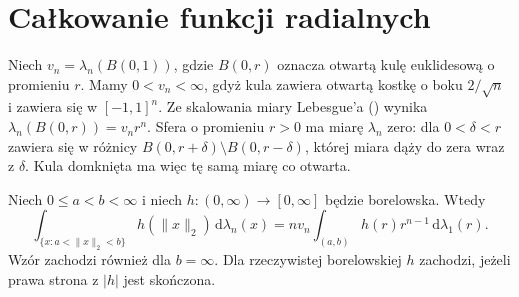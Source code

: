 \section{Całkowanie funkcji radialnych}

Niech $v_n=\lambda_n(B(0,1))$, gdzie $B(0,r)$
oznacza otwartą kulę euklidesową o promieniu $r$.
Mamy $0<v_n<\infty$, gdyż kula zawiera otwartą
kostkę o boku $2/\sqrt n$ i zawiera się w $[-1,1]^n$.
Ze skalowania miary Lebesgue'a
()
wynika $\lambda_n(B(0,r))=v_nr^n$.
Sfera o promieniu $r>0$ ma miarę $\lambda_n$ zero:
dla $0<\delta<r$ zawiera się w różnicy
$B(0,r+\delta)\setminus B(0,r-\delta)$, której
miara dąży do zera wraz z $\delta$.
Kula domknięta ma więc tę samą miarę co otwarta.

\begin{twierdzenie}
\label{ma2:thm:improper-radial}
Niech $0\le a<b<\infty$ i niech
$h:(0,\infty)\to[0,\infty]$ będzie borelowska.
Wtedy
\[
 \int_{\{x:a<\|x\|_2<b\}}h(\|x\|_2)\,
 \mathrm d\lambda_n(x)
 =nv_n\int_{(a,b)}h(r)r^{n-1}\,\mathrm d\lambda_1(r).
\]
Wzór zachodzi również dla $b=\infty$.
Dla rzeczywistej borelowskiej $h$ zachodzi,
jeżeli prawa strona z $|h|$ jest skończona.
\end{twierdzenie}
